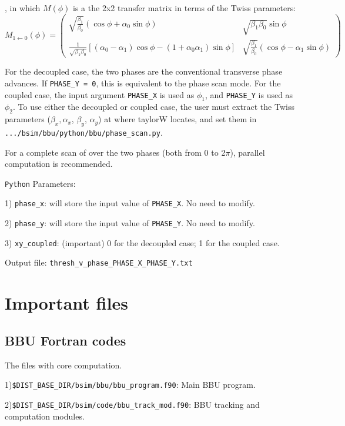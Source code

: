 \documentclass{hitec}
\begin{document}
, in which $M(\phi)$ is a the 2x2 transfer matrix in terms of the Twiss parameters:
\[
M_{1 \leftarrow 0}(\phi) =
\begin{pmatrix}
  \sqrt{\frac{\beta_{1}}{\beta_{0}}} (\cos\phi+\alpha_{0}\sin\phi) & \sqrt{\beta_{1} \beta_{0}}\sin\phi \\ 
  \frac{1}{\sqrt{\beta_{1}\beta_{0}}}[(\alpha_{0}-\alpha_{1})\cos\phi-(1+\alpha_{0}\alpha_{1})\sin\phi] & \sqrt{\frac{\beta_{1}}{\beta_{0}}} (\cos\phi-\alpha_{1}\sin\phi) 
\end{pmatrix}
\]

For the decoupled case, the two phases are the conventional transverse phase advances. If \texttt{PHASE_Y = 0}, this is equivalent to the phase scan mode. For the coupled case, the input argument \texttt{PHASE_X} is used as $\phi_1$, and \texttt{PHASE_Y} is used as $\phi_2$.
To use either the decoupled or coupled case, the user must extract the Twiss parameters ($\beta_x, \alpha_x$, $\beta_y$, $\alpha_y$) at where taylorW locates, and set them in \texttt{.../bsim/bbu/python/bbu/phase_scan.py}.

For a complete scan of over the two phases (both from 0 to 2$\pi$), parallel computation is recommended. 

\bigbreak
\texttt{Python} Parameters:

1) \texttt{phase_x}: will store the input value of \texttt{PHASE_X}. No need to modify.

2) \texttt{phase_y}: will store the input value of \texttt{PHASE_Y}. No need to modify.

3) \texttt{xy_coupled}: (important) 0 for the decoupled case; 1 for the coupled case. 


\bigbreak     
Output file: \texttt{thresh_v_phase_PHASE_X_PHASE_Y.txt} 

\section{Important files}
\subsection{BBU Fortran codes}
The files with core computation.

1)\texttt{\$DIST_BASE_DIR/bsim/bbu/bbu_program.f90}: Main BBU program.

2)\texttt{\$DIST_BASE_DIR/bsim/code/bbu_track_mod.f90}: BBU tracking and computation modules.
\end{document}
